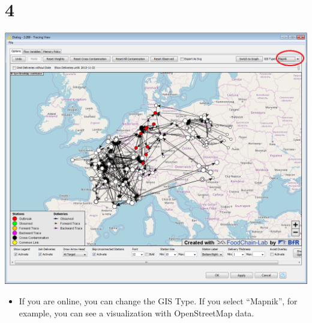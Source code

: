 \documentclass[10pt]{beamer}
\begin{document}
\section{4}
\begin{frame}
	\begin{center}
  		\includegraphics[height=0.6\textheight]{4.png}
	\end{center}
	\begin{itemize}
		\item If you are online, you can change the GIS Type. If you select ``Mapnik'', for example, you can see a visualization with OpenStreetMap data.
	\end{itemize}
\end{frame}
\end{document}
